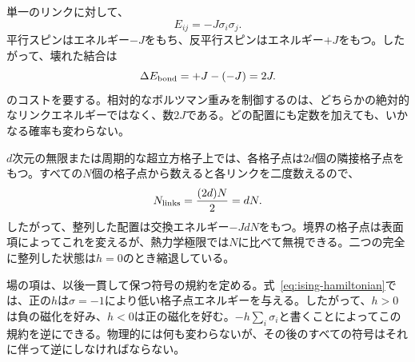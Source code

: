 単一のリンクに対して、
\begin{equation}
E_{ij}=-J\sigma_i\sigma_j.
\end{equation}
平行スピンはエネルギー\(-J\)をもち、反平行スピンはエネルギー\(+J\)をもつ。したがって、壊れた結合は
\begin{equation}
\Delta E_{\rm bond}=+J-(-J)=2J.
\label{eq:broken-bond}
\end{equation}
のコストを要する。相対的なボルツマン重みを制御するのは、どちらかの絶対的なリンクエネルギーではなく、数\(2J\)である。どの配置にも定数を加えても、いかなる確率も変わらない。

\begin{classroomqa}
\end{classroomqa}

\begin{classroomqa}
\end{classroomqa}

\(d\)次元の無限または周期的な超立方格子上では、各格子点は\(2d\)個の隣接格子点をもつ。すべての\(N\)個の格子点から数えると各リンクを二度数えるので、
\begin{equation}
N_{\rm links}=\frac{(2d)N}{2}=dN.
\label{eq:number-links}
\end{equation}
したがって、整列した配置は交換エネルギー\(-JdN\)をもつ。境界の格子点は表面項によってこれを変えるが、熱力学極限では\(N\)に比べて無視できる。二つの完全に整列した状態は\(h=0\)のとき縮退している。

場の項は、以後一貫して保つ符号の規約を定める。式~\eqref{eq:ising-hamiltonian}では、正の\(h\)は\(\sigma=-1\)により低い格子点エネルギーを与える。したがって、\(h>0\)は負の磁化を好み、\(h<0\)は正の磁化を好む。\(-h\sum_i\sigma_i\)と書くことによってこの規約を逆にできる。物理的には何も変わらないが、その後のすべての符号はそれに伴って逆にしなければならない。

